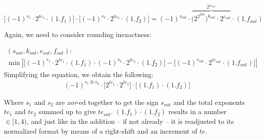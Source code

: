 \begin{equation}\label{equ:multiplication_equation_001}
    \big[ (-1)^{s_1} \cdot 2^{te_1} \cdot (1.f_1) \big] \cdot \big[ (-1)^{s_2} \cdot 2^{te_2} \cdot (1.f_2) \big] =(-1)^{s_{out}} \cdot \overbrace{\big(2^{2^{ES}}\big)^{k_{out}} \cdot 2^{e_{out}}}^{2^{te_{out}}} \cdot (1.f_{out})
\end{equation}

Again, we need to consider rounding inexactness:

\begin{equation}
\begin{gathered}
    (s_{out}, k_{out}, e_{out}, f_{out}): \\
    \min \left| \big[ (-1)^{s_1} \cdot 2^{te_1} \cdot (1.f_1) \cdot (-1)^{s_2} \cdot 2^{te_2} \cdot (1.f_2) \big] - \big[ (-1)^{s_{out}} \cdot 2^{te_{out}} \cdot (1.f_{out}) \big] \right|
\end{gathered}
\end{equation}
Simplifying the equation, we obtain the following:
\begin{equation}
\begin{gathered}
    (-1)^{s_1 \oplus s_2}  \cdot \big[ 2^{te_1} \cdot 2^{te_2} \big] \cdot \big[ (1.f_1) \cdot (1.f_2) \big]
\end{gathered}
\end{equation}

Where $s_1$ and $s_2$ are \textit{xor}-ed together to get the sign $s_{out}$ and the total exponents $te_1$ and $te_2$ summed up to give $te_{out}$. 
$(1.f_1) \cdot (1.f_2)$ results in a number $\in [1, 4)$, and just like in the addition -- if not already -- it is readjusted to its normalized format by means of a right-shift and an increment of $te$.


